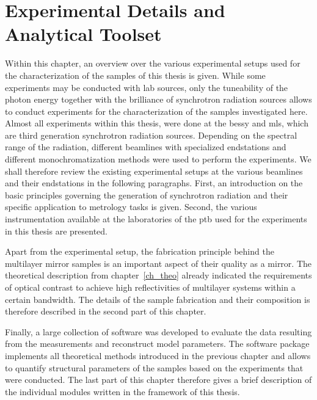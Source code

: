 \chapter{Experimental Details and Analytical Toolset} \label{ch_exp}
Within this chapter, an overview over the various experimental setups used for the characterization of the samples of this thesis is given. While some experiments may be conducted with lab sources, only the tuneability of the photon energy together with the brilliance of synchrotron radiation sources allows to conduct experiments for the characterization of the samples investigated here. Almost all experiments within this thesis, were done at the \gls{bessy} and \gls{mls}, which are third generation synchrotron radiation sources. Depending on the spectral range of the radiation, different beamlines with specialized endstations and different monochromatization methods were used to perform the experiments. We shall therefore review the existing experimental setups at the various beamlines and their endstations in the following paragraphs. First, an introduction on the basic principles governing the generation of synchrotron radiation and their specific application to metrology tasks is given. Second, the various instrumentation available at the laboratories of the \gls{ptb} used for the experiments in this thesis are presented.

Apart from the experimental setup, the fabrication principle behind the multilayer mirror samples is an important aspect of their quality as a mirror. The theoretical description from chapter~\ref{ch_theo} already indicated the requirements of optical contrast to achieve high reflectivities of multilayer systems within a certain bandwidth. The details of the sample fabrication and their composition is therefore described in the second part of this chapter.

Finally, a large collection of software was developed to evaluate the data resulting from the measurements and reconstruct model parameters. The software package implements all theoretical methods introduced in the previous chapter and allows to quantify structural parameters of the samples based on the experiments that were conducted. The last part of this chapter therefore gives a brief description of the individual modules written in the framework of this thesis.

